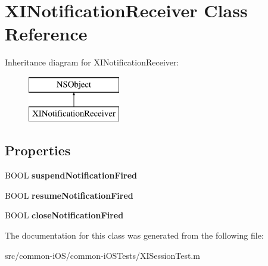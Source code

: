 \hypertarget{interface_x_i_notification_receiver}{}\section{X\+I\+Notification\+Receiver Class Reference}
\label{interface_x_i_notification_receiver}
Inheritance diagram for X\+I\+Notification\+Receiver\+:\begin{figure}[H]
\begin{center}
\leavevmode
\includegraphics[height=2.000000cm]{interface_x_i_notification_receiver}
\end{center}
\end{figure}
\subsection*{Properties}
\begin{DoxyCompactItemize}
\item 
\hypertarget{interface_x_i_notification_receiver_ade1759c4ca02f1f7ba0d508591d01a26}{}\label{interface_x_i_notification_receiver_ade1759c4ca02f1f7ba0d508591d01a26} 
B\+O\+OL {\bfseries suspend\+Notification\+Fired}
\item 
\hypertarget{interface_x_i_notification_receiver_a6757afeb0aeea0feda14af0532552089}{}\label{interface_x_i_notification_receiver_a6757afeb0aeea0feda14af0532552089} 
B\+O\+OL {\bfseries resume\+Notification\+Fired}
\item 
\hypertarget{interface_x_i_notification_receiver_a08cf0f2b0bcf01eeeaa64b9076732eaa}{}\label{interface_x_i_notification_receiver_a08cf0f2b0bcf01eeeaa64b9076732eaa} 
B\+O\+OL {\bfseries close\+Notification\+Fired}
\end{DoxyCompactItemize}


The documentation for this class was generated from the following file\+:\begin{DoxyCompactItemize}
\item 
src/common-\/i\+O\+S/common-\/i\+O\+S\+Tests/X\+I\+Session\+Test.\+m\end{DoxyCompactItemize}
